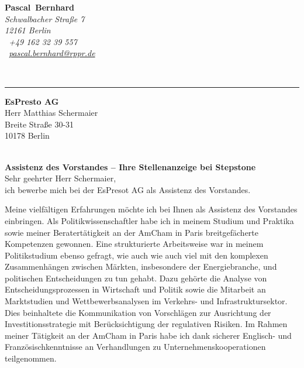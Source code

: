 \documentclass[11pt,a4paper]{article}
\def\firstname{Pascal}
\def\familyname{Bernhard}
\begin{document}
\sffamily   %
\hfill%
\begin{minipage}[t]{.6\textwidth}
	\raggedleft%
	{\bfseries {\color{firstnamecolor}\firstname}~{\color{familynamecolor}\familyname}}\\[.35ex]
	\small\itshape%
	Schwalbacher Straße 7\\
	12161 Berlin\\[.35ex]
	\Mobilefone~+49 162 32 39 557 \\
	\Letter~\href{mailto:pascal.bernhard@rppr.de}{pascal.bernhard@rppr.de}
\end{minipage}\\[0.5em]
%
{\color{firstnamecolor}\rule{\textwidth}{.25ex}}
%
\begin{minipage}[t]{.4\textwidth}
	\raggedright%
	\vspace*{1em}
	\textbf{EsPresto AG} \\
	Herr Matthias Schermaier \\[.35ex]
	\small%
	Breite Straße 30-31\\
	10178 Berlin
\end{minipage}
%
\hfill
%
\begin{minipage}[t]{.4\textwidth}
	\raggedleft %
\end{minipage}\\[1em]


{\bfseries \color{familynamecolor}Assistenz des Vorstandes -- Ihre Stellenanzeige bei Stepstone}\\[0.75em]

Sehr geehrter Herr Schermaier,\\[0.5em]
%
ich bewerbe mich bei der EsPresot AG als Assistenz des Vorstandes.

Meine vielfältigen Erfahrungen möchte ich bei Ihnen als Assistenz des Vorstandes einbringen. Als Politikwissenschaftler habe ich in meinem Studium und Praktika sowie meiner Beratertätigkeit an der AmCham in Paris breitgefächerte Kompetenzen gewonnen. Eine strukturierte Arbeitsweise war in meinem Politikstudium ebenso gefragt, wie auch wie auch viel mit den komplexen Zusammen­hängen zwischen Märkten, insbesondere der Energiebranche, und politischen Entscheidungen zu tun gehabt. Dazu gehörte die Analyse von Entscheidungsprozessen in Wirtschaft und Politik sowie die Mitarbeit an Marktstudien und Wettbewerbsanalysen im Verkehrs- und Infrastruktursektor. Dies beinhaltete die Kommunikation von Vorschlägen zur Ausrichtung der Investitionsstrategie mit Berücksichtigung der regulativen Risiken. Im Rahmen meiner Tätigkeit an der AmCham in Paris habe ich dank sicherer Englisch- und Französischkenntnisse an Verhandlungen zu Unternehmenskooperationen teilgenommen. 
\end{document}
